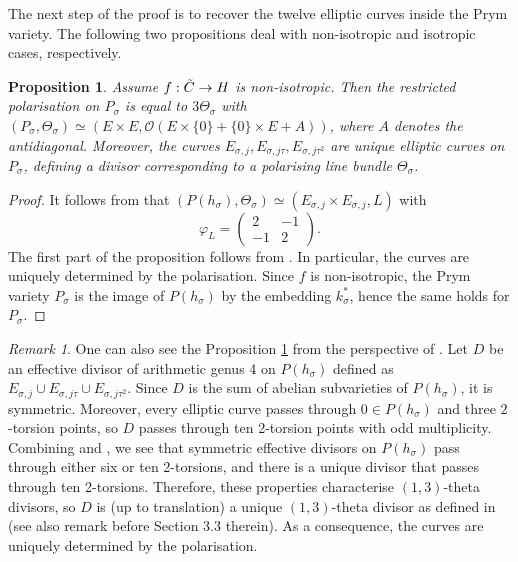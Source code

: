 \documentclass{amsart}
\newtheorem{prop}[thm]{Proposition}
\theoremstyle{remark}
\newtheorem{rem}[thm]{Remark}
\numberwithin{equation}{section}
\newcommand{\tC}{\Tilde{C}}
\newcommand{\cO}{\mathcal{O}}
\newcommand{\s}{\sigma}
\begin{document}
\vspace{3mm}

The next step of the proof is to recover the twelve elliptic curves inside the Prym variety. The following two propositions deal with non-isotropic and isotropic cases, respectively.

\begin{prop}
\label{elnoniso}
    Assume $f:\tC \to H$ is non-isotropic.
    Then the restricted polarisation on $P_{\sigma}$ is equal to $3\Theta_{\sigma}$ with $(P_{\sigma},\Theta_{\sigma}) \simeq (E \times E, \cO(E \times \{0\} + \{0\} \times E + A))$, where $A$ denotes the antidiagonal. Moreover, the curves $E_{\sigma,j}, E_{\sigma,j\tau}, E_{\sigma,j\tau^2}$ are unique elliptic curves on $P_{\sigma}$, defining a divisor corresponding to a polarising line bundle $\Theta_\s$.
\end{prop}

\begin{proof}

    It follows from \cite[Theorem 1, page 67]{ries} that $(P(h_\s),\Theta_\s) \simeq (E_{\s,j} \times E_{\s, j}, L)$ with $$\varphi_L = \begin{pmatrix}
        2 & -1 \\ -1 & 2
    \end{pmatrix}.$$
    The first part of the proposition follows from \cite[Lemma 5.4]{BLiso}.
In particular, the curves are uniquely determined by the polarisation. Since $f$ is non-isotropic, the Prym variety $P_{\s}$ is the image of $P(h_{\s})$ by the embedding $k_{\sigma}^*$, hence the same holds for $P_{\sigma}$.  
\end{proof}
    

\begin{rem}
    One can also see the Proposition \ref{elnoniso} from the perspective of \cite{BSan}. Let $D$ be an effective divisor of arithmetic genus 4 on $P(h_{\s})$ defined as
    $E_{\sigma,j}\cup E_{\sigma,j\tau}\cup E_{\sigma,j\tau^2}$. Since $D$ is the sum of abelian subvarieties of $P(h_{\s})$, it is symmetric. Moreover, every elliptic curve passes through $0 \in P(h_{\s})$ and three $2$-torsion points, so $D$ passes through ten 2-torsion points with odd multiplicity. Combining \cite[Prop 3.3]{BSan} and \cite[Prop 2.5]{BSan}, we see that symmetric effective divisors on $P(h_{\s})$ pass through either six or ten 2-torsions, and there is a unique divisor that passes through ten 2-torsions. Therefore, these properties characterise $(1,3)$-theta divisors, so $D$ is (up to translation) a unique $(1,3)$-theta divisor as defined in \cite{BSan} (see also remark before Section 3.3 therein). As a consequence, the curves are uniquely determined by the polarisation.
\end{rem}
\end{document}

